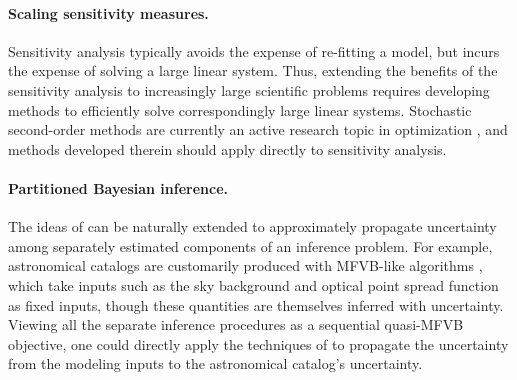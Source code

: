 
\paragraph{Scaling sensitivity measures.}

Sensitivity analysis typically avoids the expense of re-fitting a model, but
incurs the expense of solving a large linear system.  Thus, extending
the benefits of the sensitivity analysis to increasingly large scientific
problems requires developing methods to efficiently solve correspondingly large
linear systems.  Stochastic second-order methods are currently an active
research topic in optimization \citep{agarwal:2017:secondorder,
berahas:2020:newtonsketch}, and methods developed therein should apply
directly to sensitivity analysis.

\paragraph{Partitioned Bayesian inference.}

The ideas of \citep{giordano:2018:covariances} can be naturally extended to
approximately propagate uncertainty among separately estimated components of an
inference problem.  For example, astronomical catalogs are customarily produced
with MFVB-like algorithms \citep{lang:2016:tractor, regier:2019:cataloging},
which take inputs such as the sky background and optical point spread function
as fixed inputs, though these quantities are themselves inferred with
uncertainty.  Viewing all the separate inference procedures as a sequential
quasi-MFVB objective, one could directly apply the techniques of
\citep{giordano:2018:covariances} to propagate the uncertainty from the modeling
inputs to the astronomical catalog's uncertainty.



\newpage





